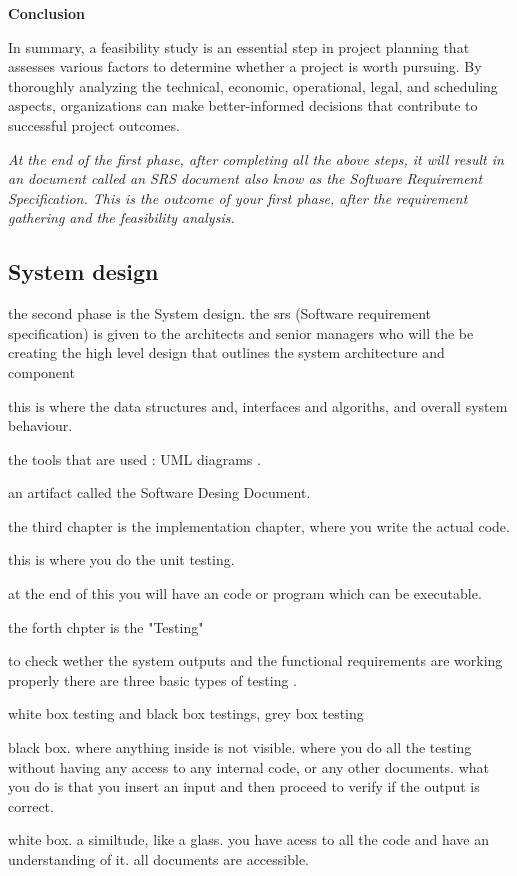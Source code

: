 \documentclass[a4paper]{article}
\begin{document}
\textbf{Conclusion}

In summary, a feasibility study is an essential step in project planning that assesses various factors to determine whether 
a project is worth pursuing. By thoroughly analyzing the technical, economic, operational, legal, and scheduling aspects, 
organizations can make better-informed decisions that contribute to successful project outcomes.

\textit{At the end of the first phase, after completing all the above steps, it will result in an document called an SRS document also know as the 
Software Requirement Specification. This is the outcome of your first phase, after the requirement gathering and the feasibility analysis.}

\subsection{System design}
the second phase is the System design.
 the srs (Software requirement specification) is given to the architects and senior managers who will the be creating the high level design that 
outlines the system architecture and component 

this is where the data structures and, interfaces and algoriths, and overall system behaviour.
  
the tools that are used : UML diagrams .

an artifact called the Software Desing Document. 

the third chapter is the implementation chapter, where you write the actual code. 

this is where you do the unit testing.   

at the end of this you will have an code or program which can be executable.


the forth chpter is the "Testing"

to check wether the system outputs and the functional requirements are working properly
there are three basic types of testing .

white box testing and black box testings, grey box testing 

black box. where anything inside is not visible. where you do all the testing without having any access to any internal code, or any other documents.
what you do is that you insert an input and then proceed to verify if the output is correct.



white box. a similtude, like a glass. you have acess to all the code and have an understanding of it. all documents are accessible.
\end{document}
